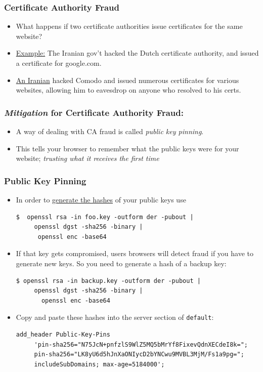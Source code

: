 \documentclass[9pt]{beamer}
\begin{document}
\begin{frame}[fragile]
\frametitle{Certificate Authority Fraud}
\begin{itemize}
\item What happens if two certificate authorities issue certificates for the same website?
\pause
\item \href{http://arstechnica.com/security/2011/08/earlier-this-year-an-iranian/}{Example:} The Iranian gov't hacked the Dutch certificate authority, and issued a certificate for google.com.
\pause
\item \href{http://arstechnica.com/security/2011/03/independent-iranian-hacker-claims-responsibility-for-comodo-hack/}{An Iranian} hacked Comodo and issued numerous certificates for various websites, allowing him to eavesdrop on anyone who resolved to his certs.
\end{itemize}
\end{frame}

\begin{frame}[fragile]
\frametitle{\emph{Mitigation} for Certificate Authority Fraud:}
\begin{itemize}
\item A way of dealing with CA fraud is called \emph{public key pinning}.
\pause
\item This tells your browser to remember what the public keys were for your website; \emph{trusting what it receives the first time}
\end{itemize}
\end{frame}

\begin{frame}[fragile]
\frametitle{Public Key Pinning}
\begin{itemize}
\item In order to \href{https://developer.mozilla.org/en-US/docs/Web/Security/Public_Key_Pinning}{generate the hashes} of your public keys use
\begin{verbatim}
$  openssl rsa -in foo.key -outform der -pubout |
     openssl dgst -sha256 -binary |
      openssl enc -base64
\end{verbatim}
\pause 
\item If that key gets compromised, users browsers will detect fraud if you have to generate new keys. So you need to generate a hash of a backup key:
\begin{verbatim}
$ openssl rsa -in backup.key -outform der -pubout | 
     openssl dgst -sha256 -binary |
       openssl enc -base64
\end{verbatim}
\pause
\item Copy and paste these hashes into the server section of \texttt{default}:
\begin{verbatim}
add_header Public-Key-Pins 
     'pin-sha256="N75JcN+pnfzlS9WlZ5MQ5bMrYf8FixevQdnXECdeI8k="; 
     pin-sha256="LK8yU6d5hJnXaONIycD2bYNCwu9MVBL3MjM/Fs1a9pg="; 
     includeSubDomains; max-age=5184000';
\end{verbatim}
\end{itemize}
\end{frame}
\end{document}
